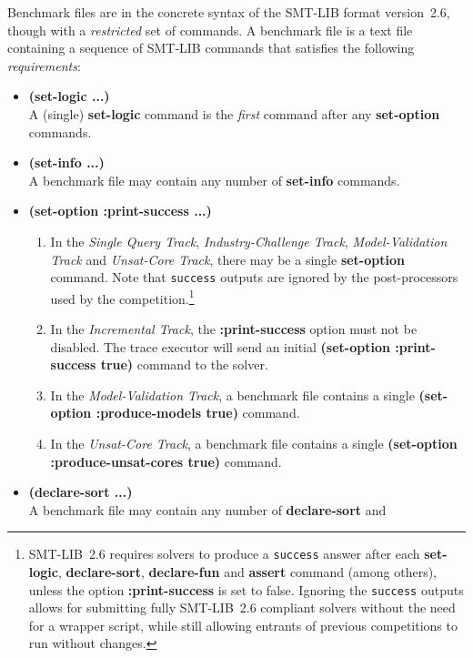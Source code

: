 \documentclass[12pt]{article}
\newcommand{\akey}[1]{\textbf{#1}\xspace}
\newcommand{\bkey}[1]{\textbf{{#1}}\xspace}
\newcommand{\maintrack}{Single Query Track\xspace}
\newcommand{\inctrack}{Incremental Track\xspace}
\newcommand{\ucoretrack}{Unsat-Core Track\xspace}
\newcommand{\mvaltrack}{Model-Validation Track\xspace}
\newcommand{\challtrack}{Industry-Challenge Track\xspace}
\begin{document}
Benchmark files are in the concrete syntax of the SMT-LIB format
version~2.6, though with a \emph{restricted} set of commands.  A benchmark
file is a text file containing a sequence of SMT-LIB commands that
satisfies the following \emph{requirements}:
%
\begin{itemize}
  \item \bkey{(set-logic ...)}\\
    A (single) \akey{set-logic} command is the \emph{first} command after
    any \akey{set-option} commands.
  \item \bkey{(set-info ...)}\\
    A benchmark file may contain any number of \akey{set-info} commands.
  \item
    \bkey{(set-option :print-success ...)}
    \begin{enumerate}[label=(\alph*)]
      \vspace{-1ex}
    \item In the \emph{\maintrack}, \emph{\challtrack}, \emph{\mvaltrack} and
        \emph{\ucoretrack}, there may be a single \akey{set-option} command.
        Note that \texttt{success} outputs are ignored by the post-processors
        used by the competition.\footnote{SMT-LIB~2.6 requires solvers to
        produce a \texttt{success} answer after each \akey{set-logic},
        \akey{declare-sort}, \akey{declare-fun} and \akey{assert} command
        (among others), unless the option \akey{:print-success} is set to
        false.  Ignoring the \texttt{success} outputs allows for submitting
        fully SMT-LIB~2.6 compliant solvers without the need for a wrapper
        script, while still allowing entrants of previous competitions to run
        without changes.}
      \item In the \emph{\inctrack}, the \akey{:print-success} option
        must not be disabled.  The trace executor will send an initial
        \akey{(set-option :print-success true)} command to the solver.
      \item In the \emph{\mvaltrack}, a benchmark file contains a single
        \akey{(set-option :produce-models true)} command.
      \item In the \emph{\ucoretrack}, a benchmark file contains a single
        \akey{(set-option :produce-unsat-cores true)} command.
    \end{enumerate}
  \item \bkey{(declare-sort ...)}\\
    A benchmark file may contain any number of \akey{declare-sort} and

\end{itemize}
\end{document}
